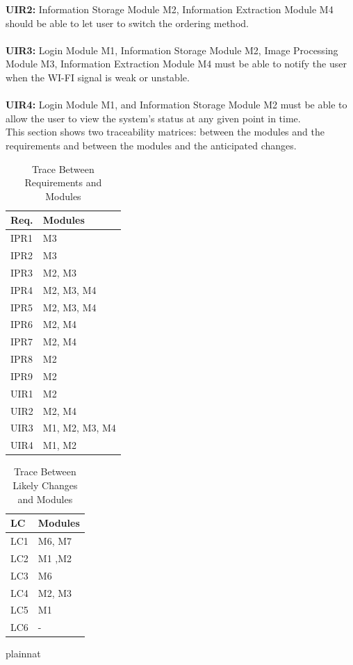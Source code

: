 \documentclass[12pt, titlepage]{article}
\begin{document}
\textbf{UIR2:} Information Storage Module M2, Information Extraction Module M4 should be able to let user to switch the ordering method.\\\\
\textbf{UIR3:} Login Module M1, Information Storage Module M2, Image Processing Module M3, Information Extraction Module M4 must be able to notify the user when the WI-FI signal is weak or unstable.\\\\
\textbf{UIR4:} Login Module M1, and Information Storage Module M2 must be able to allow the user to view the system's status at any given point in time.\\

This section shows two traceability matrices: between the modules and the
requirements and between the modules and the anticipated changes.

\begin{table}[H]
\centering
\begin{tabular}{p{} p{}}
\toprule
\textbf{Req.} & \textbf{Modules}\\
\midrule
IPR1 & M3\\
IPR2 & M3\\
IPR3 & M2, M3\\
IPR4 & M2, M3, M4\\
IPR5 & M2, M3, M4\\
IPR6 & M2, M4\\
IPR7 & M2, M4\\
IPR8 & M2\\
IPR9 & M2\\
UIR1 & M2\\
UIR2 & M2, M4\\
UIR3 & M1, M2, M3, M4\\
UIR4 & M1, M2\\
\bottomrule
\end{tabular}
\caption{Trace Between Requirements and Modules}
\label{TblRT}
\end{table}

\begin{table}[H]
\centering
\begin{tabular}{p{} p{}}
\toprule
\textbf{LC} & \textbf{Modules}\\
\midrule
LC1 & M6, M7\\
LC2 & M1 ,M2\\
LC3 & M6\\
LC4 & M2, M3\\
LC5 & M1\\
LC6 & -\\
\bottomrule
\end{tabular}
\caption{Trace Between Likely Changes and Modules}
\label{TblACT}
\end{table}




 {plainnat}

\end{document}
